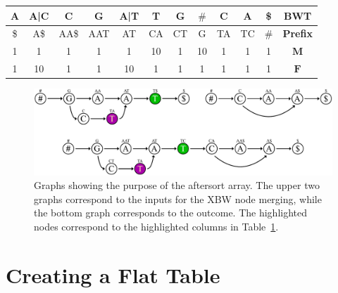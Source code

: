 \documentclass[a4paper,12pt,twoside,BCOR=10mm]{scrbook}
\begin{document}
\begin{table}[htb]
\begin{tabular}{ | c | c | c | c | c | c | c | c | c | c | c | c | }
\hline
A & A|C & C & G & A|T & T & G & $\#$ &\cellcolor{purple_bg}\color{purple_fx}C &\cellcolor{green_bg}\color{green_fx}A & \$ & \textbf{BWT} \\ \hline
\$ & A\$ & AA\$ & AAT & AT & CA & CT & G &\cellcolor{purple_bg}\color{purple_fx}TA &\cellcolor{green_bg}\color{green_fx}TC & $\#$ & \textbf{Prefix} \\ \hline
1 & 1 & 1 & 1 & 1 & 10 & 1 & 10 &\cellcolor{purple_bg}\color{purple_fx}1 &\cellcolor{green_bg}\color{green_fx}1 & 1 & $\boldsymbol{M}$ \\ \hline
1 & 10 & 1 & 1 & 10 & 1 & 1 & 1 &\cellcolor{purple_bg}\color{purple_fx}1 &\cellcolor{green_bg}\color{green_fx}1 & 1 & $\boldsymbol{F}$ \\ \hline
\end{tabular}

\label{table:node_merge_aftersort}
\end{table}
\begin{figure}[!htb]
\centering
\includegraphics[width=\textwidth]{evo_fig_node_merge_aftersort.pdf}
\caption[Graphs showing purpose of aftersort array]{Graphs showing the purpose of the aftersort array. The upper two graphs correspond to the inputs for the XBW node merging, while the bottom graph corresponds to the outcome. The highlighted nodes correspond to the highlighted columns in Table~\ref{table:node_merge_aftersort}.} \label{fig:evo_fig_node_merge_aftersort}
\end{figure}

\section{Creating a Flat Table}
%
\end{document}
